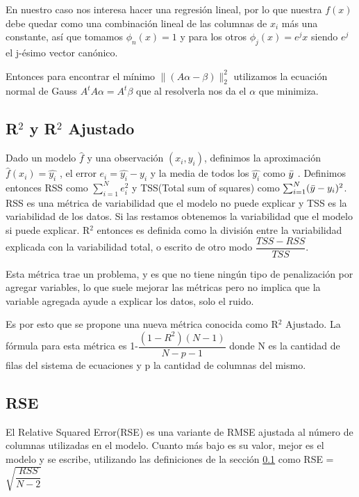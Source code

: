     En nuestro caso nos interesa hacer una regresión lineal, por lo que nuestra $f(x)$ debe quedar como una combinación lineal de las columnas de $x_{i}$ más una constante, así que tomamos $\phi_{n}(x) = 1$ y para los otros $\phi_{j}(x)=e^{j} x$ siendo $e^{j}$ el j-ésimo vector canónico. 
    
    Entonces para encontrar el mínimo $\lVert(A\alpha-\beta)\rVert^{2}_{2}$ utilizamos la ecuación normal de Gauss $A^{t}A\alpha = A^{t}\beta$ que al resolverla nos da el $\alpha$ que minimiza.
    \subsection{R$^2$ y R$^2$ Ajustado}\label{sec:intro_R2/R2}
    Dado un modelo $\hat{f}$ y una observación $(x_{i},y_{i})$, definimos la aproximación $\hat{f}(x_{i})=\hat{y_{i}}$ , el error $e_{i}=\hat{y_{i}}-y_{i} $ y la media de todos los $\hat{y_{i}}$ como $\Bar{y}$ . Definimos entonces RSS como $\sum_{i=1}^{N}e_{i}^{2}$ y TSS(Total sum of squares) como $\sum_{i=1}^{N}(\Bar{y}-y_{i})^{2}$. RSS es una métrica de variabilidad que el modelo no puede explicar y TSS es la variabilidad de los datos. Si las restamos obtenemos la variabilidad que el modelo si puede explicar.
    R$^2$ entonces es definida como la división entre la variabilidad explicada con la variabilidad total, o escrito de otro modo $\dfrac{TSS-RSS}{TSS}$.
    
    Esta métrica trae un problema, y es que no tiene ningún tipo de penalización por agregar variables, lo que suele mejorar las métricas pero no implica que la variable agregada ayude a explicar los datos, solo el ruido.
    
    Es por esto que se propone una nueva métrica conocida como R$^2$ Ajustado. La fórmula para esta métrica es 1-$\dfrac{(1-R^2)(N-1)}{N-p-1}$ donde N es la cantidad de filas del sistema de ecuaciones y p la cantidad de columnas del mismo.
    
    
    \subsection{RSE}\label{sec:intro_RSE}
    El Relative Squared Error(RSE) es una variante de RMSE ajustada al número de columnas utilizadas en el modelo. Cuanto más bajo es su valor, mejor es el modelo y se escribe, utilizando las definiciones de la sección \ref{sec:intro_R2/R2} como RSE =$\sqrt{\dfrac{RSS}{N-2}}$